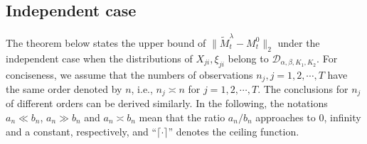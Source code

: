 \documentclass[12pt]{article}
\begin{document}

\subsection{Independent case}
\label{sec:3.2}
  The theorem below states the upper bound of $\|\widetilde{M}_t^\lambda - M_t^0\|_2$ under the independent case when the distributions of $X_{ji},\xi_{ji}$ belong to $\mathcal{D}_{\alpha,\beta,K_1,K_2}$. For conciseness, we assume that the numbers of observations $n_j,j=1,2,\cdots,T$ have the same order denoted by $n$, i.e., $n_j\asymp n$ for $j=1,2,\cdots,T$. The conclusions for $n_j$ of different orders can be derived similarly. In the following, the notations $a_n\ll b_n$, $a_n\gg b_n$ and $a_n\asymp b_n$ mean that the ratio $a_n/b_n$ approaches to 0, infinity and  a constant, respectively,  and ``$\lceil \cdot \rceil$'' denotes the ceiling function.
\end{document}
